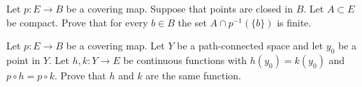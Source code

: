 \begin{problem}
  Let $p\colon E\to B$ be a covering map. Suppose that points are closed in
  $B$. Let $A\subset E$ be compact. Prove that for every $b\in B$ the set
  $A\cap p^{-1}(\{b\})$ is finite.
\end{problem}
\begin{solution}
\end{solution}

\begin{problem}
  Let $p\colon E\to B$ be a covering map. Let $Y$ be a path-connected space
  and let $y_0$ be a point in $Y$. Let $h,k\colon Y\to E$ be continuous
  functions with $h(y_0)=k(y_0)$ and $p\circ h=p\circ k$. Prove that $h$
  and $k$ are the same function.
\end{problem}
\begin{solution}
\end{solution}

